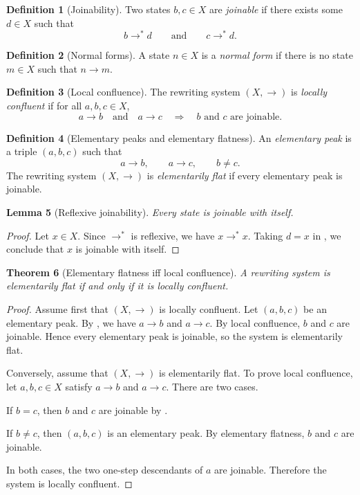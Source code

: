 \documentclass[11pt]{article}
\numberwithin{equation}{section}
\newtheorem{theorem}{Theorem}[section]
\newtheorem{lemma}[theorem]{Lemma}
\theoremstyle{definition}
\newtheorem{definition}[theorem]{Definition}
\theoremstyle{remark}
\begin{document}
\begin{definition}[Joinability]
\label{def:joinability}
Two states $b,c \in X$ are \emph{joinable} if there exists some $d \in X$ such that
\[
b \to^* d
\qquad\text{and}\qquad
c \to^* d.
\]
\end{definition}

\begin{definition}[Normal forms]
\label{def:normal-form}
A state $n \in X$ is a \emph{normal form} if there is no state $m \in X$ such that $n \to m$.
\end{definition}

\begin{definition}[Local confluence]
\label{def:local-confluence}
The rewriting system $(X,\to)$ is \emph{locally confluent} if for all $a,b,c \in X$,
\[
a \to b
\quad\text{and}\quad
a \to c
\quad\Longrightarrow\quad
b \text{ and } c \text{ are joinable.}
\]
\end{definition}

\begin{definition}[Elementary peaks and elementary flatness]
\label{def:elementary-peak-flatness}
An \emph{elementary peak} is a triple $(a,b,c)$ such that
\[
a \to b,
\qquad
a \to c,
\qquad
b \neq c.
\]
The rewriting system $(X,\to)$ is \emph{elementarily flat} if every elementary peak is joinable.
\end{definition}

\begin{lemma}[Reflexive joinability]
\label{lem:joinable-refl}
Every state is joinable with itself.
\end{lemma}

\begin{proof}
Let $x \in X$. Since $\to^*$ is reflexive, we have $x \to^* x$. Taking $d=x$ in , we conclude that $x$ is joinable with itself.
\end{proof}

\begin{theorem}[Elementary flatness iff local confluence]
\label{thm:elementary-flatness-iff-local-confluence}
A rewriting system is elementarily flat if and only if it is locally confluent.
\end{theorem}

\begin{proof}
Assume first that $(X,\to)$ is locally confluent. Let $(a,b,c)$ be an elementary peak. By , we have $a \to b$ and $a \to c$. By local confluence, $b$ and $c$ are joinable. Hence every elementary peak is joinable, so the system is elementarily flat.

Conversely, assume that $(X,\to)$ is elementarily flat. To prove local confluence, let $a,b,c \in X$ satisfy $a \to b$ and $a \to c$. There are two cases.

If $b=c$, then $b$ and $c$ are joinable by .

If $b \neq c$, then $(a,b,c)$ is an elementary peak. By elementary flatness, $b$ and $c$ are joinable.

In both cases, the two one-step descendants of $a$ are joinable. Therefore the system is locally confluent.
\end{proof}
\end{document}

